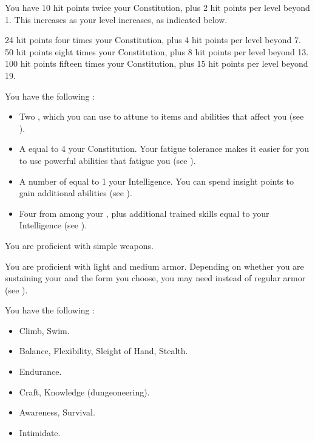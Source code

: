             You have 10 hit points \add twice your Constitution, plus 2 hit points per level beyond 1.
            This increases as your level increases, as indicated below.
            \begin{itemize}
                 24 hit points \add four times your Constitution, plus 4 hit points per level beyond 7.
                 50 hit points \add eight times your Constitution, plus 8 hit points per level beyond 13.
                 100 hit points \add fifteen times your Constitution, plus 15 hit points per level beyond 19.
            \end{itemize}

         You have the following :
        \begin{itemize}
            \item Two , which you can use to attune to items and abilities that affect you (see ).
            \item A  equal to 4 \add your Constitution.
                Your fatigue tolerance makes it easier for you to use powerful abilities that fatigue you (see ).
            \item A number of  equal to 1 \add your Intelligence.
                You can spend insight points to gain additional abilities (see ).
            \item Four  from among your , plus additional trained skills equal to your Intelligence (see ).
        \end{itemize}

        You are proficient with simple weapons.

        You are proficient with light and medium armor.
        Depending on whether you are sustaining your  and the form you choose, you may need  instead of regular armor (see ).

        You have the following :
        \begin{itemize}
            \item {} Climb, Swim.
            \item {} Balance, Flexibility, Sleight of Hand, Stealth.
            \item {} Endurance.
            \item {} Craft, Knowledge (dungeoneering).
            \item {} Awareness, Survival.
            \item {} Intimidate.
        \end{itemize}

